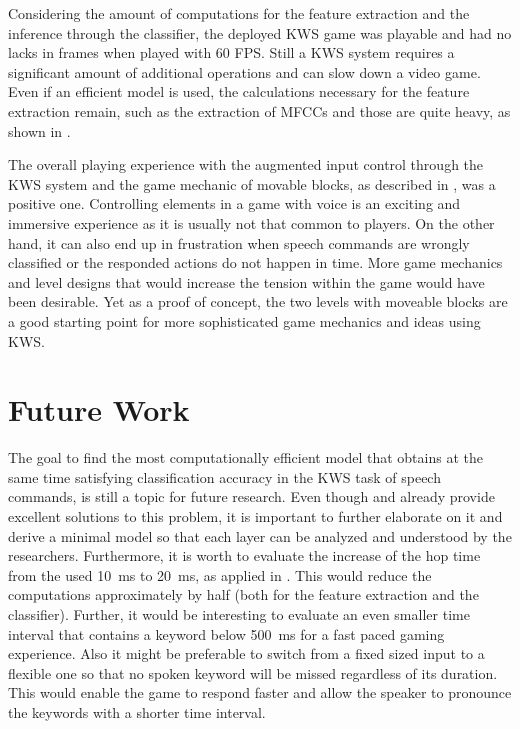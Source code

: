 Considering the amount of computations for the feature extraction and the inference through the classifier, the deployed KWS game was playable and had no lacks in frames when played with 60 FPS.
Still a KWS system requires a significant amount of additional operations and can slow down a video game.
Even if an efficient model is used, the calculations necessary for the feature extraction remain, such as the extraction of MFCCs and those are quite heavy, as shown in .

The overall playing experience with the augmented input control through the KWS system and the game mechanic of movable blocks, as described in , was a positive one.
Controlling elements in a game with voice is an exciting and immersive experience as it is usually not that common to players.
On the other hand, it can also end up in frustration when speech commands are wrongly classified or the responded actions do not happen in time.
More game mechanics and level designs that would increase the tension within the game would have been desirable.
Yet as a proof of concept, the two levels with moveable blocks are a good starting point for more sophisticated game mechanics and ideas using KWS.



\section{Future Work}
The goal to find the most computationally efficient model that obtains at the same time satisfying classification accuracy in the KWS task of speech commands, is still a topic for future research.
Even though \cite{Zhang2017} and \cite{Peter2020} already provide excellent solutions to this problem, it is important to further elaborate on it and derive a minimal model so that each layer can be analyzed and understood by the researchers.
Furthermore, it is worth to evaluate the increase of the hop time from the used \SI{10}{\milli\second} to \SI{20}{\milli\second}, as applied in \cite{Peter2020}.
This would reduce the computations approximately by half (both for the feature extraction and the classifier).
Further, it would be interesting to evaluate an even smaller time interval that contains a keyword below \SI{500}{\milli\second} for a fast paced gaming experience.
Also it might be preferable to switch from a fixed sized input to a flexible one so that no spoken keyword will be missed regardless of its duration.
This would enable the game to respond faster and allow the speaker to pronounce the keywords with a shorter time interval.

